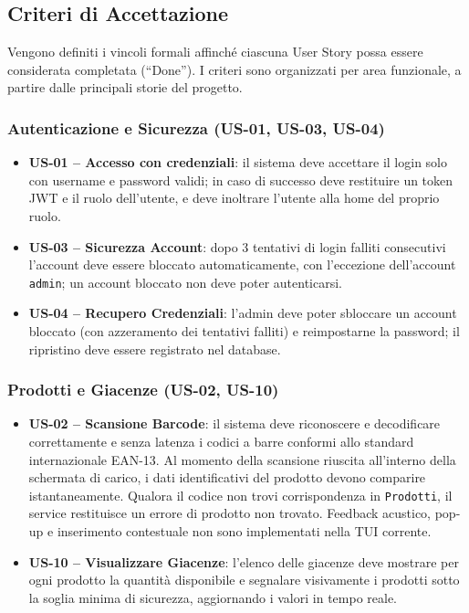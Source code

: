 \documentclass[a4paper,12pt]{article}
\begin{document}
\subsection{Criteri di Accettazione}
Vengono definiti i vincoli formali affinché ciascuna User Story possa essere considerata completata (``Done''). I criteri sono organizzati per area funzionale, a partire dalle principali storie del progetto.

\subsubsection*{Autenticazione e Sicurezza (US-01, US-03, US-04)}
\begin{itemize}
    \item \textbf{US-01 -- Accesso con credenziali}: il sistema deve accettare il login solo con username e password validi; in caso di successo deve restituire un token JWT e il ruolo dell'utente, e deve inoltrare l'utente alla home del proprio ruolo.
    \item \textbf{US-03 -- Sicurezza Account}: dopo 3 tentativi di login falliti consecutivi l'account deve essere bloccato automaticamente, con l'eccezione dell'account \texttt{admin}; un account bloccato non deve poter autenticarsi.
    \item \textbf{US-04 -- Recupero Credenziali}: l'admin deve poter sbloccare un account bloccato (con azzeramento dei tentativi falliti) e reimpostarne la password; il ripristino deve essere registrato nel database.
\end{itemize}

\subsubsection*{Prodotti e Giacenze (US-02, US-10)}
\begin{itemize}
    \item \textbf{US-02 -- Scansione Barcode}: il sistema deve riconoscere e decodificare correttamente e senza latenza i codici a barre conformi allo standard internazionale EAN-13. Al momento della scansione riuscita all'interno della schermata di carico, i dati identificativi del prodotto devono comparire istantaneamente. Qualora il codice non trovi corrispondenza in \texttt{Prodotti}, il service restituisce un errore di prodotto non trovato. Feedback acustico, pop-up e inserimento contestuale non sono implementati nella TUI corrente.
    \item \textbf{US-10 -- Visualizzare Giacenze}: l'elenco delle giacenze deve mostrare per ogni prodotto la quantit\`{a} disponibile e segnalare visivamente i prodotti sotto la soglia minima di sicurezza, aggiornando i valori in tempo reale.
\end{itemize}
\end{document}
